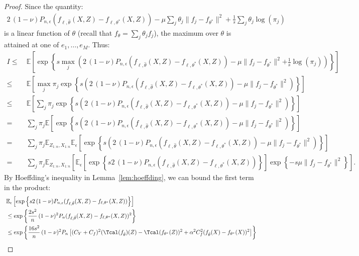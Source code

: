 \documentclass[12pt]{extarticle} %
\newcommand{\E}{\mathbb{E}}
\begin{document}
\begin{proof}
Since the quantity:
\begin{align*}
   2\,(1-\nu) P_{n,\epsilon}(f_{\ell,\hat{\theta}}(X,Z) - f_{\ell,\theta^*}(X,Z)) - \mu \sum_j \theta_j \|f_j - f_{\theta^*}\|^2 +\frac{1}{s}\sum_j\theta_j \log(\pi_j)
\end{align*}
is a linear function of $\theta$ (recall that $f_{\theta}=\sum_j \theta_j f_j$), the maximum over $\theta$ is attained at one of $e_1, \ldots, e_M$. Thus:
\begin{align*}
    I \leq ~&\E\left[\exp\left\{s \max_{j} \left(2\,(1-\nu) P_{n,\epsilon}(f_{\ell,\hat{\theta}}(X,Z) - f_{\ell,\theta^*}(X,Z)) - \mu \|f_j - f_{\theta^*}\|^2{+\frac{1}{s}\log(\pi_j)}\right)\right\}\right]\\
    \leq~& \E\left[\max_{j}{\pi_j} \exp\left\{s \left(2\,(1-\nu) P_{n,\epsilon}(f_{\ell,\hat{\theta}}(X,Z) - f_{\ell,\theta^*}(X,Z)) - \mu \|f_j - f_{\theta^*}\|^2\right)\right\}\right]\\
    \leq~& \E\left[\sum_{j} {\pi_j} \exp\left\{s \left(2\,(1-\nu) P_{n,\epsilon}(f_{\ell,\hat{\theta}}(X,Z) - f_{\ell,\theta^*}(X,Z)) - \mu \|f_j - f_{\theta^*}\|^2\right)\right\}\right]\\
    =~&\sum_{j} {\pi_j} \E\left[ \exp\left\{s \left(2\,(1-\nu) P_{n,\epsilon}(f_{\ell,\hat{\theta}}(X,Z) - f_{\ell,\theta^*}(X,Z)) - \mu \|f_j - f_{\theta^*}\|^2\right)\right\}\right]\\
    =~& \sum_{j} {\pi_j}\E_{Z_{1:n},X_{1:n}}\E_\epsilon\left[ \exp\left\{s \left(2\,(1-\nu) P_{n,\epsilon}(f_{\ell,\hat{\theta}}(X,Z) - f_{\ell,\theta^*}(X,Z)) - \mu \|f_j - f_{\theta^*}\|^2\right)\right\}\right]\\
    =~& \sum_{j} {\pi_j}\E_{Z_{1:n},X_{1:n}}\left[ \E_\epsilon\left[ \exp\left\{s 2\,(1-\nu) P_{n,\epsilon}(f_{\ell,\hat{\theta}}(X,Z) - f_{\ell,\theta^*}(X,Z))\right\}\right] \exp\left\{- s \mu \|f_j - f_{\theta^*}\|^2\right\}\right].
\end{align*}
By Hoeffding's inequality in Lemma~\ref{lem:hoeffding}, we can bound the first term in the product:
\begin{align*}
    ~&\E_\epsilon\left[ \exp\left\{s 2\,(1-\nu) P_{n,\epsilon}(f_{\ell,\hat{\theta}}(X,Z) - f_{\ell,\theta^*}(X,Z))\right\}\right]\\
    ~&\leq \exp\left\{\frac{2 s^2}{n}\,(1-\nu)^2 P_n(f_{\ell,\hat{\theta}}(X,Z) - f_{\ell,\theta^*}(X,Z))^2\right\}\\
    ~&\leq \exp\left\{\frac{16 s^2}{n}\,(1-\nu)^2 P_n\left[(C_Y+C_f)^2(\Tcal(f_{\hat{\theta}})(Z)-\Tcal(f_{\theta^*}(Z))^2 + \alpha^2 C_f^2(f_{\hat{\theta}}(X)-f_{\theta^*}(X))^2\right]\right\}\\

\end{align*}
\end{proof}
\end{document}
